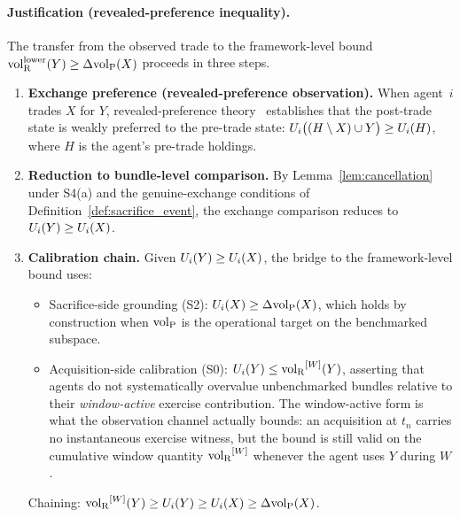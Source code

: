 \paragraph{Justification (revealed-preference inequality).}
The transfer from the observed trade to the framework-level
bound ${\operatorname{vol}_{\mathrm{R}}^{\mathrm{lower}}}(Y) \geq \Delta{\operatorname{vol}_{\mathrm{P}}}(X)$ proceeds in three
steps.

\begin{enumerate}
\item \textbf{Exchange preference (revealed-preference
  observation).}
  When agent~$i$ trades $X$ for $Y$, revealed-preference
  theory~\citep{samuelson1938note} establishes that the
  post-trade state is weakly preferred to the pre-trade state:
  $U_i\bigl((H \setminus X) \cup Y\bigr) \geq U_i(H)$,
  where $H$ is the agent's pre-trade holdings.

\item \textbf{Reduction to bundle-level comparison.}
  By Lemma~\ref{lem:cancellation} under S4(a) and the
  genuine-exchange conditions of
  Definition~\ref{def:sacrifice_event}, the exchange comparison
  reduces to $U_i(Y) \geq U_i(X)$.

\item \textbf{Calibration chain.}
  Given $U_i(Y) \geq U_i(X)$, the bridge to the framework-level
  bound uses:
  \begin{itemize}
  \item Sacrifice-side grounding (S2):
    $U_i(X) \geq \Delta{\operatorname{vol}_{\mathrm{P}}}(X)$, which holds by construction
    when ${\operatorname{vol}_{\mathrm{P}}}$ is the operational target on the benchmarked
    subspace.
  \item Acquisition-side calibration (S0):
    $U_i(Y) \leq {\operatorname{vol}_{\mathrm{R}}}^{[W]}(Y)$, asserting that agents do not
    systematically overvalue unbenchmarked bundles relative to
    their \emph{window-active} exercise contribution.  The
    window-active form is what the observation channel
    actually bounds: an acquisition at $t_n$ carries no
    instantaneous exercise witness, but the bound is still
    valid on the cumulative window quantity ${\operatorname{vol}_{\mathrm{R}}}^{[W]}$
    whenever the agent uses $Y$ during $W$.
  \end{itemize}
  Chaining: ${\operatorname{vol}_{\mathrm{R}}}^{[W]}(Y) \geq U_i(Y) \geq U_i(X) \geq
  \Delta{\operatorname{vol}_{\mathrm{P}}}(X)$.
\end{enumerate}

